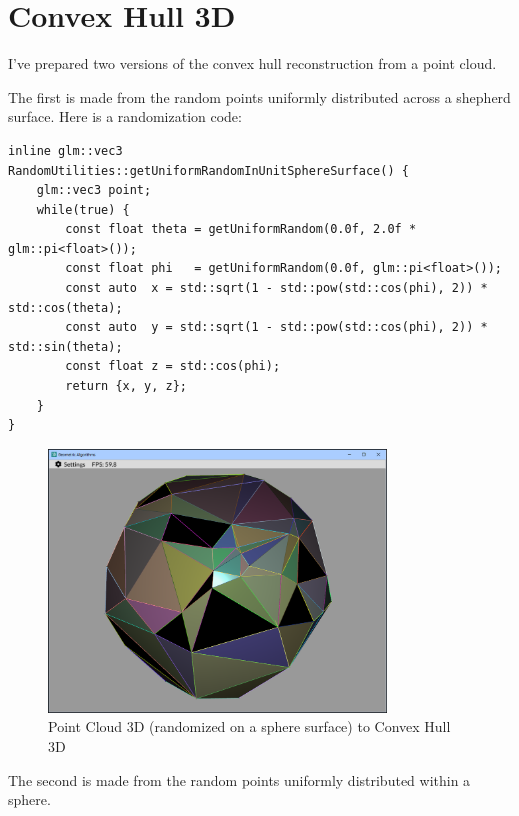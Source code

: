 \documentclass[12pt,a4paper,english]{article}
\begin{document}
\newpage

\section{Convex Hull 3D}

I've prepared two versions of the convex hull reconstruction from a point cloud.

The first is made from the random points uniformly distributed across a shepherd surface.  Here is a randomization code:

\begin{verbatim}
inline glm::vec3 RandomUtilities::getUniformRandomInUnitSphereSurface() {
    glm::vec3 point;
    while(true) {
        const float theta = getUniformRandom(0.0f, 2.0f * glm::pi<float>());
        const float phi   = getUniformRandom(0.0f, glm::pi<float>());
        const auto  x = std::sqrt(1 - std::pow(std::cos(phi), 2)) * std::cos(theta);
        const auto  y = std::sqrt(1 - std::pow(std::cos(phi), 2)) * std::sin(theta);
        const float z = std::cos(phi);
        return {x, y, z};
    }
}
\end{verbatim}

\begin{figure}[H]
    \centering
    \includegraphics[width=0.8\textwidth]{p4-2-a}
    \caption[]{Point Cloud 3D (randomized on a sphere surface) to Convex Hull 3D}
    \label{fig:p4-2-a}
\end{figure}

\newpage

The second is made from the random points uniformly distributed within a sphere.
\end{document}
